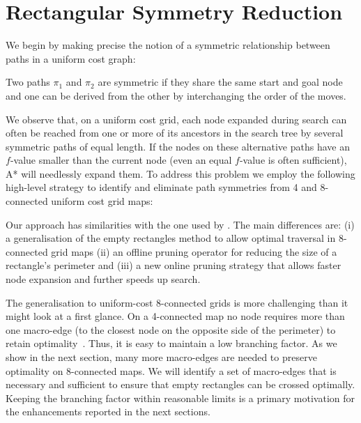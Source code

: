 \section{Rectangular Symmetry Reduction}
\label{sec:rsr}


We begin by making precise the notion of a symmetric relationship between paths
in a uniform cost graph:
\begin{definition}
Two paths $\pi_{1}$ and $\pi_{2}$ are symmetric if they share the same start and
goal node and one can be derived from the other by interchanging the order of the
moves.
\end{definition}

We observe that, on a uniform cost grid, each node expanded during search can
often be reached from one or more of its ancestors in the search tree by several 
symmetric paths of equal length.
If the nodes on these alternative paths have an $f$-value smaller than the
current node (even an equal $f$-value is often sufficient), A* will needlessly
expand them.  To address this problem we employ the following high-level
strategy to identify and eliminate path symmetries from 4 and 8-connected
uniform cost grid maps:


Our approach has similarities with the one used by
\cite{harabor10}.  The main differences are: (i) a
generalisation of the empty rectangles method to allow optimal traversal in
8-connected grid maps (ii) an offline pruning operator for reducing the size of
a rectangle's perimeter and (iii) a new online pruning strategy that allows faster
node expansion and further speeds up search.

The generalisation to uniform-cost 8-connected grids is more challenging than it might look
at a first glance.  On a 4-connected map no node requires more than one
macro-edge (to the closest node on the opposite side of the perimeter) to retain
optimality~\cite{harabor10}.  Thus, it is easy to maintain a low branching
factor.
As we show in the next section, many more macro-edges are
needed to preserve optimality on 8-connected maps. We will identify a set of
macro-edges that is necessary and sufficient to ensure that empty rectangles can
be crossed optimally.  Keeping the branching factor within reasonable limits is
a primary motivation for the enhancements reported in the next sections.


